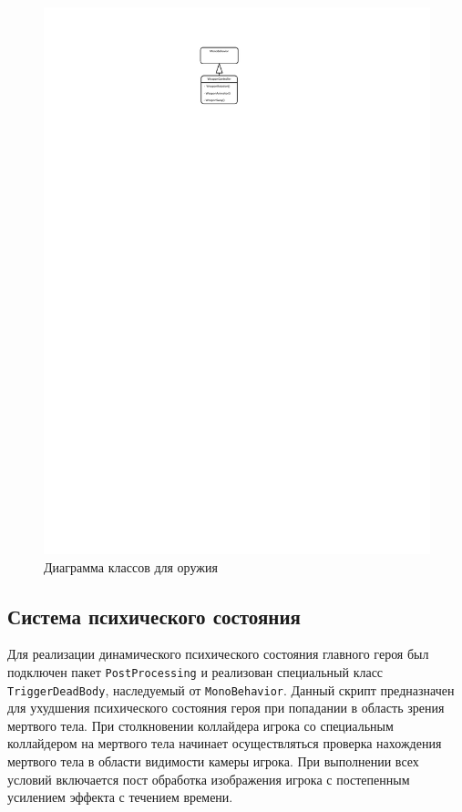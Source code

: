\begin{figure}[H]
    \centering
    \includegraphics[width=9 cm]{figures/Weapon.pdf}
    \caption{Диаграмма классов для оружия}
    \label{fig:Weapon}
\end{figure}

\subsection{Система психического состояния}
Для реализации динамического психического состояния главного героя был подключен пакет \texttt{PostProcessing} и реализован специальный класс \texttt{TriggerDeadBody}, наследуемый от \texttt{MonoBehavior}. Данный скрипт предназначен для ухудшения психического состояния героя при попадании в область зрения мертвого тела. При столкновении коллайдера игрока со специальным коллайдером на мертвого тела начинает осуществляться проверка нахождения мертвого тела в области видимости камеры игрока. При выполнении всех условий включается пост обработка изображения игрока с постепенным усилением эффекта с течением времени.

